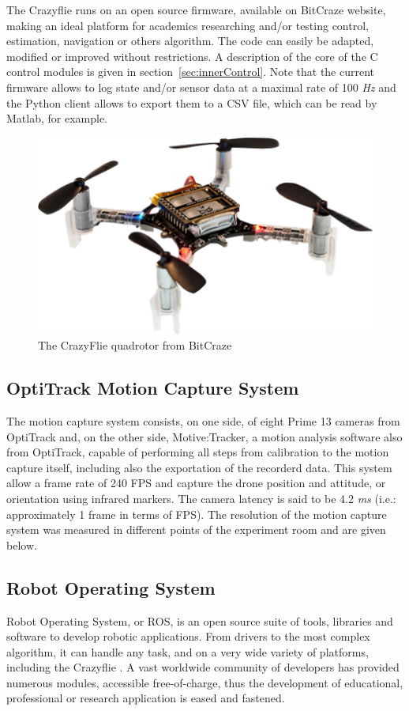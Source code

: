 \documentclass[a4paper, 12pt]{report}
\begin{document}
The Crazyflie runs on an open source firmware, available on BitCraze website\cite{bitcraze}, making an ideal platform for academics researching and/or testing control, estimation, navigation or others algorithm. The code can easily be adapted, modified or improved without restrictions. A description of the core of the C control modules is given in section~\ref{sec:innerControl}. Note that the current firmware allows to log state and/or sensor data at a maximal rate of 100 \emph{Hz} and the Python client allows to export them to a CSV file, which can be read by Matlab, for example.

\begin{figure}[htbp]
\centering
\includegraphics[width=.4\textwidth]{Images/crazyflie}
\captionsetup[subfloat]{labelformat=empty}
\caption{The CrazyFlie quadrotor from BitCraze}
\label{fig:cf}
\end{figure}

\subsection{OptiTrack Motion Capture System}
The motion capture system consists, on one side, of eight Prime 13 cameras from OptiTrack and, on the other side, Motive:Tracker, a motion analysis software also from OptiTrack, capable of performing all steps from calibration to the motion capture itself, including also the exportation of the recorderd data.
This system allow a frame rate of 240 FPS and capture the drone position and attitude, or orientation using infrared markers. The camera latency is said to be 4.2 \textit{ms} (i.e.: approximately 1 frame in terms of FPS). The resolution of the motion capture system was measured in different points of the experiment room and are given below.

\subsection{Robot Operating System}
Robot Operating System, or ROS, is an open source suite of tools, libraries and software to develop robotic applications. From drivers to the most complex algorithm, it can handle any task, and on a very wide variety of platforms, including the Crazyflie \cite{Hoenig2015}. A vast worldwide community of developers has provided numerous modules, accessible free-of-charge, thus the development of educational, professional or research application is eased and fastened.
\end{document}
